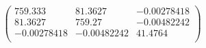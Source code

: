 \documentclass{article}
\begin{document}
\[\left(
\begin{array}{ccc}
 759.333 & 81.3627 & -0.00278418 \\
 81.3627 & 759.27 & -0.00482242 \\
 -0.00278418 & -0.00482242 & 41.4764 \\
\end{array}
\right)\]
\end{document}
